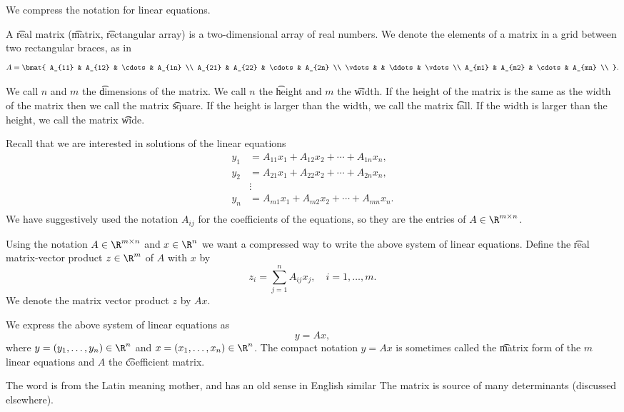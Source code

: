 
We compress the notation for linear equations.

A \t{real matrix} (\t{matrix}, \t{rectangular array}) is a two-dimensional array of real numbers.
We denote the elements of a matrix in a grid between two rectangular braces, as in
  \[
A = \bmat{
A_{11} & A_{12} & \cdots & A_{1n} \\
A_{21} & A_{22} & \cdots & A_{2n} \\
\vdots & & \ddots & \vdots \\
A_{m1} & A_{m2} & \cdots & A_{mn} \\
}.
  \]

We call $n$ and $m$ the \t{dimensions} of the matrix.
We call $n$ the \t{height} and $m$ the \t{width}.
If the height of the matrix is the same as the width of the matrix then we call the matrix \t{square}.
If the height is larger than the width, we call the matrix \t{tall}.
If the width is larger than the height, we call the matrix \t{wide}.

Recall that we are interested in solutions of the linear equations
  \[
\begin{aligned}
y_1 &= A_{11}x_1 + A_{12}x_2 + \cdots + A_{1n}x_n, \\
y_2 &= A_{21}x_1 + A_{22}x_2 + \cdots + A_{2n}x_n, \\
&\vdots \\
y_n &= A_{m1}x_1 + A_{m2}x_2 + \cdots + A_{mn}x_n. \\
\end{aligned}
  \]
We have suggestively used the notation $A_{ij}$ for the coefficients of the equations, so they are the entries of $A \in \R ^{m \times n}$.

Using the notation $A \in \R ^{m \times n}$ and $x \in \R ^n$ we want a compressed way to write the above system of linear equations.
Define the \t{real matrix-vector product} $z \in \R ^m$ of $A$ with $x$ by
  \[
z_{i} = \sum_{j = 1}^{n} A_{ij}x_j, \quad i = 1, \dots, m.
  \]
We denote the matrix vector product $z$ by $Ax$.

We express the above system of linear equations as
  \[
y = Ax,
  \]
where $y = (y_1, \dots, y_n) \in \R ^{n}$ and $x = (x_1, \dots, x_n) \in \R ^n$.
The compact notation $y = Ax$ is sometimes called the \t{matrix form} of the $m$ linear equations and $A$ the \t{coefficient matrix}.

The word  is from the Latin  meaning mother, and has an old sense in English similar 
The matrix is source of many determinants (discussed elsewhere).
